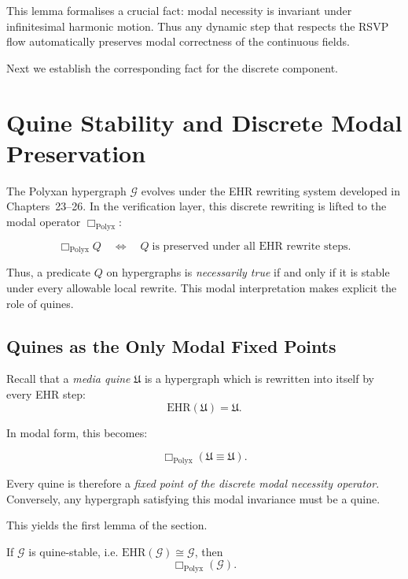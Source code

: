 This lemma formalises a crucial fact:
modal necessity is invariant under infinitesimal harmonic motion.
Thus any dynamic step that respects the RSVP flow   
automatically preserves modal correctness of the continuous fields.

Next we establish the corresponding fact for the discrete component.

\section{Quine Stability and Discrete Modal Preservation}
\label{sec:37-quine-stability}

The Polyxan hypergraph $\mathcal{G}$ evolves under the
EHR rewriting system developed in Chapters~23--26.
In the verification layer, this discrete rewriting is lifted
to the modal operator $\Box_{\mathrm{Polyx}}$:

\begin{equation}
\Box_{\mathrm{Polyx}} Q
\quad\Longleftrightarrow\quad
Q \;\text{is preserved under all EHR rewrite steps}.
\label{eq:modal-eh}
\end{equation}

Thus, a predicate $Q$ on hypergraphs is \emph{necessarily true}
if and only if it is stable under every allowable local rewrite.
This modal interpretation makes explicit the role of quines.

\subsection{Quines as the Only Modal Fixed Points}

Recall that a \emph{media quine} $\mathfrak{U}$ is a hypergraph
which is rewritten into itself by every EHR step:
\[
\mathrm{EHR}(\mathfrak{U}) = \mathfrak{U}.
\]

In modal form, this becomes:

\begin{equation}
\Box_{\mathrm{Polyx}}(\mathfrak{U} \equiv \mathfrak{U}).
\label{eq:quine-modal-fixed}
\end{equation}

Every quine is therefore a \emph{fixed point of the discrete
modal necessity operator}.  
Conversely, any hypergraph satisfying this modal invariance
must be a quine.

This yields the first lemma of the section.

\begin{lemma}
\label{lem:quine-stability}
If $\mathcal{G}$ is quine-stable, i.e.
$\mathrm{EHR}(\mathcal{G}) \cong \mathcal{G}$,
then
\[
\Box_{\mathrm{Polyx}}(\mathcal{G}).
\]
\end{lemma}


